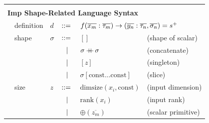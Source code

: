 \documentclass[preprint]{sigplanconf}
\begin{document}
\begin{figure}
\begin{tabular}{| m{0.1cm}m{1.2cm}m{0.1cm}m{0.2cm}p{2cm}p{2.4cm} |}
\hline
& & & & &\\
 \multicolumn{6}{|l|}{\textbf{Imp Shape-Related Language Syntax}} \\[4pt]
& definition        & $d$      & $::=$ & 
      \multicolumn{2}{l|}{$f(\overline{x_m} : \overline{\tau_m}) \rightarrow
(\overline{y_n} : \overline{\tau_n}, \overline{\sigma_n}) = s^{\small{+}}$}
\\[4pt]
& shape             & $\sigma$ & $::=$ & $ [] $                                            &  \quad \small{(shape of scalar)}      \\[2pt]
&                   &          & $\ \ | \ \ $    & $ \sigma +\!\!\!\!+\, \sigma $                         &  \quad \small{(concatenate)}      \\[2pt]
&                   &          & $\ \ | \ \ $    & $ [z] $                                           &  \quad \small{(singleton)}   \\[2pt]
&                   &          & $\ \ | \ \ $    & $ \sigma[\mathrm{const} \ldots  \mathrm{const}] $ &  \quad \small{(slice)}       \\[4pt]
& size              & $z$      & $::=$ & $ \mathrm{dimsize}(x_i, \mathrm{const}) $         &  \quad \small{(input dimension)}   \\[2pt]
&                   &          & $\ \ | \ \ $    & $ \mathrm{rank}(x_i) $                            &  \quad \small{(input rank)}  \\[2pt]
&                   &          & $\ \ | \ \ $    & $ \oplus(\overline{z_m})$
              &  \quad \small{(scalar primitive)}    \\[2pt]

\end{tabular}
\end{figure}
\end{document}
